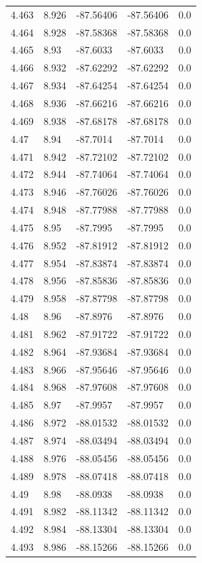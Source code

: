 \begin{tabular}{lllll}
4.463 & 8.926 & -87.56406 & -87.56406 & 0.0 \\
4.464 & 8.928 & -87.58368 & -87.58368 & 0.0 \\
4.465 & 8.93 & -87.6033 & -87.6033 & 0.0 \\
4.466 & 8.932 & -87.62292 & -87.62292 & 0.0 \\
4.467 & 8.934 & -87.64254 & -87.64254 & 0.0 \\
4.468 & 8.936 & -87.66216 & -87.66216 & 0.0 \\
4.469 & 8.938 & -87.68178 & -87.68178 & 0.0 \\
4.47 & 8.94 & -87.7014 & -87.7014 & 0.0 \\
4.471 & 8.942 & -87.72102 & -87.72102 & 0.0 \\
4.472 & 8.944 & -87.74064 & -87.74064 & 0.0 \\
4.473 & 8.946 & -87.76026 & -87.76026 & 0.0 \\
4.474 & 8.948 & -87.77988 & -87.77988 & 0.0 \\
4.475 & 8.95 & -87.7995 & -87.7995 & 0.0 \\
4.476 & 8.952 & -87.81912 & -87.81912 & 0.0 \\
4.477 & 8.954 & -87.83874 & -87.83874 & 0.0 \\
4.478 & 8.956 & -87.85836 & -87.85836 & 0.0 \\
4.479 & 8.958 & -87.87798 & -87.87798 & 0.0 \\
4.48 & 8.96 & -87.8976 & -87.8976 & 0.0 \\
4.481 & 8.962 & -87.91722 & -87.91722 & 0.0 \\
4.482 & 8.964 & -87.93684 & -87.93684 & 0.0 \\
4.483 & 8.966 & -87.95646 & -87.95646 & 0.0 \\
4.484 & 8.968 & -87.97608 & -87.97608 & 0.0 \\
4.485 & 8.97 & -87.9957 & -87.9957 & 0.0 \\
4.486 & 8.972 & -88.01532 & -88.01532 & 0.0 \\
4.487 & 8.974 & -88.03494 & -88.03494 & 0.0 \\
4.488 & 8.976 & -88.05456 & -88.05456 & 0.0 \\
4.489 & 8.978 & -88.07418 & -88.07418 & 0.0 \\
4.49 & 8.98 & -88.0938 & -88.0938 & 0.0 \\
4.491 & 8.982 & -88.11342 & -88.11342 & 0.0 \\
4.492 & 8.984 & -88.13304 & -88.13304 & 0.0 \\
4.493 & 8.986 & -88.15266 & -88.15266 & 0.0 \\

\end{tabular}
